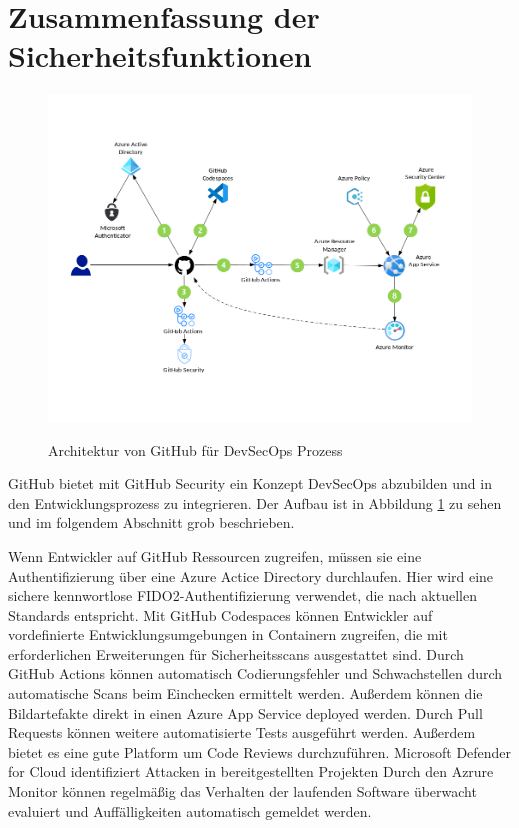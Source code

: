 \section{Zusammenfassung der Sicherheitsfunktionen}
\begin{figure}[H]
	{\caption{Architektur von GitHub für DevSecOps Prozess}
		\label{FIG:devsecops-in-github}}
	{\includegraphics[width=1\textwidth]{figures/devsecops-in-github.png}}
\end{figure}
GitHub bietet mit GitHub Security ein Konzept DevSecOps abzubilden und in den Entwicklungsprozess zu integrieren. Der Aufbau ist in Abbildung \ref{FIG:devsecops-in-github} zu sehen und im folgendem Abschnitt grob beschrieben.

Wenn Entwickler auf GitHub Ressourcen zugreifen, müssen sie eine Authentifizierung über eine Azure Actice Directory durchlaufen. Hier wird eine sichere kennwortlose  FIDO2-Authentifizierung verwendet, die nach aktuellen Standards entspricht. \cite{mic-fido2}
Mit GitHub Codespaces können Entwickler auf vordefinierte Entwicklungsumgebungen in Containern zugreifen, die mit erforderlichen Erweiterungen für Sicherheitsscans ausgestattet sind.
Durch GitHub Actions können automatisch Codierungsfehler und Schwachstellen durch automatische Scans beim Einchecken ermittelt werden.
Außerdem können die Bildartefakte direkt in einen Azure App Service deployed werden.
Durch Pull Requests können weitere automatisierte Tests ausgeführt werden. Außerdem bietet es eine gute Platform um Code Reviews durchzuführen.
Microsoft Defender for Cloud identifiziert Attacken in bereitgestellten Projekten
Durch den Azrure Monitor können regelmäßig das Verhalten der laufenden Software überwacht evaluiert und Auffälligkeiten automatisch gemeldet werden.\cite{mic-devsecops-github}

